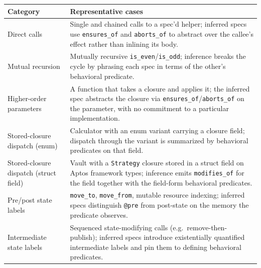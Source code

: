 \begin{WideTable}
    \caption{Inference test categories that exercise behavioral predicates.}
    \label{tab:inference-tests}
    \centering
    \small
    \begin{tabularx}{\linewidth}{l X}
      \hline
      \textbf{Category} & \textbf{Representative cases} \\
      \hline
      Direct calls &
        Single and chained calls to a spec'd helper; inferred specs use
        \texttt{ensures\_of} and \texttt{aborts\_of} to abstract over the
        callee's effect rather than inlining its body. \\
      \hline
      Mutual recursion &
        Mutually recursive \texttt{is\_even}/\texttt{is\_odd}; inference
        breaks the cycle by phrasing each spec in terms of the other's
        behavioral predicate. \\
      \hline
      Higher-order parameters &
        A function that takes a closure and applies it; the inferred spec
        abstracts the closure via \texttt{ensures\_of}/\texttt{aborts\_of}
        on the parameter, with no commitment to a particular implementation. \\
      \hline
      Stored-closure dispatch (enum) &
        Calculator with an enum variant carrying a closure field;
        dispatch through the variant is summarized by behavioral
        predicates on that field. \\
      \hline
      Stored-closure dispatch (struct field) &
        Vault with a \texttt{Strategy} closure stored in a struct field on
        Aptos framework types; inference emits \texttt{modifies\_of} for
        the field together with the field-form behavioral predicates. \\
      \hline
      Pre/post state labels &
        \texttt{move\_to}, \texttt{move\_from}, mutable resource indexing;
        inferred specs distinguish \texttt{@pre} from post-state on the
        memory the predicate observes. \\
      \hline
      Intermediate state labels &
        Sequenced state-modifying calls (e.g.\ remove-then-publish);
        inferred specs introduce existentially quantified intermediate
        labels and pin them to defining behavioral predicates. \\
      \hline
    \end{tabularx}
\end{WideTable}


\label{sec:inference}

